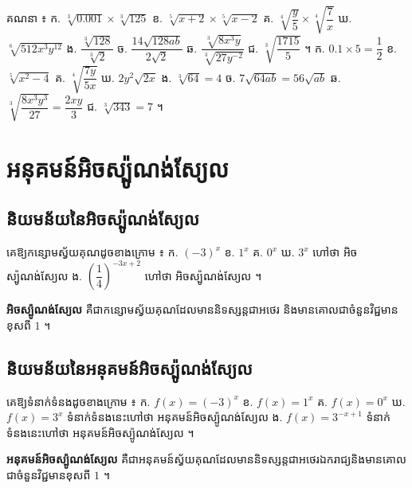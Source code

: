 \begin{pro}
គណនា ៖ \quad ក. $\sqrt[3]{0.001}\times\sqrt[3]{125}$ \quad ខ. $\sqrt[5]{x+2}\times\sqrt[5]{x-2}$ \quad គ. $\sqrt[4]{\dfrac{y}{5}}\times\sqrt[4]{\dfrac{7}{x}}$ \quad ឃ. $\sqrt[6]{512x^3y^{12}}$ \quad ង. $\dfrac{\sqrt[3]{128}}{\sqrt[3]{2}}$ \quad ច. $\dfrac{14\sqrt{128ab}}{2\sqrt{2}}$ \quad ឆ. $\dfrac{\sqrt[3]{8x^3y}}{\sqrt[3]{27y^{-2}}}$ \quad ជ. $\sqrt[3]{\dfrac{1715}{5}}$ ។
\ans
ក. $0.1\times 5 = \dfrac{1}{2}$ \quad ខ. $\sqrt[5]{x^2 - 4}$ \quad គ. $\sqrt[4]{\dfrac{7y}{5x}}$ \quad ឃ. $2y^2\sqrt{2x}$ \quad ង. $\sqrt[3]{64} = 4$ \quad ច. $7\sqrt{64ab} = 56\sqrt{ab}$ \quad ឆ. $\sqrt[3]{\dfrac{8x^3y^3}{27}} = \dfrac{2xy}{3}$ \quad ជ. $\sqrt[3]{343} = 7$ ។
\end{pro}

\section{អនុគមន៍អិចស្ប៉ូណង់ស្យែល}
\subsection{និយមន័យនៃអិចស្ប៉ូណង់ស្យែល}
\begin{example}[ឧទាហរណ៍]
គេឱ្យកន្សោមស្វ័យគុណដូចខាងក្រោម ៖ ក. $(-3)^x$ \quad ខ. $1^x$ \quad គ. $0^x$ \quad ឃ. $3^x$ ហៅថា អិចស្ប៉ូណង់ស្យែល \quad ង. $\left(\dfrac{1}{4}\right)^{-3x+2}$ ហៅថា អិចស្ប៉ូណង់ស្យែល ។
\end{example}
\begin{definition}[និយមន័យ]
\textbf{អិចស្ប៉ូណង់ស្យែល} គឺជាកន្សោមស្វ័យគុណដែលមាននិទស្សន្តជាអថេរ និងមានគោលជាចំនួនវិជ្ជមានខុសពី $1$ ។
\end{definition}

\subsection{និយមន័យនៃអនុគមន៍អិចស្ប៉ូណង់ស្យែល}
\begin{example}[ឧទាហរណ៍]
គេឱ្យទំនាក់ទំនងដូចខាងក្រោម ៖ ក. $f(x) = (-3)^x$ \quad ខ. $f(x) = 1^x$ \quad គ. $f(x) = 0^x$ \quad ឃ. $f(x) = 3^x$ ទំនាក់ទំនងនេះហៅថា អនុគមន៍អិចស្ប៉ូណង់ស្យែល \quad ង. $f(x) = 3^{-x+1}$ ទំនាក់ទំនងនេះហៅថា អនុគមន៍អិចស្ប៉ូណង់ស្យែល ។
\end{example}
\begin{definition}[និយមន័យ]
\textbf{អនុគមន៍អិចស្ប៉ូណង់ស្យែល} គឺជាអនុគមន៍ស្វ័យគុណដែលមាននិទស្សន្តជាអថេរឯករាជ្យនិងមានគោលជាចំនួនវិជ្ជមានខុសពី $1$ ។
\end{definition}

